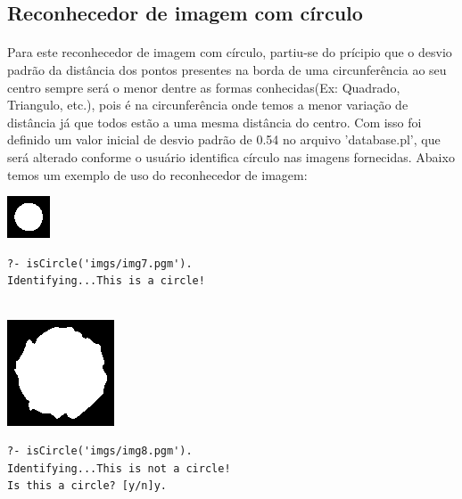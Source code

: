 \documentclass{article}
\begin{document}
\subsection*{Reconhecedor de imagem com círculo}
\paragraph{}
	Para este reconhecedor de imagem com círculo, partiu-se do prícipio que o desvio padrão da distância dos pontos presentes na borda de uma circunferência ao seu centro sempre será o menor dentre as formas conhecidas(Ex: Quadrado, Triangulo, etc.), pois é na circunferência onde temos a menor variação de distância já que todos estão a uma mesma distância do centro. Com isso foi definido um valor inicial de desvio padrão de 0.54 no arquivo 'database.pl', que será alterado conforme o usuário identifica círculo nas imagens fornecidas. Abaixo temos um exemplo de uso do reconhecedor de imagem:
	\\
\begin{center}
\includegraphics[scale=1.00]{texImgs/img7.eps}
\end{center}

\begin{center}
\begin{minipage}{6cm}
\begin{Verbatim}
?- isCircle('imgs/img7.pgm').
Identifying...This is a circle!


\end{Verbatim}
\end{minipage}
\end{center}

\begin{center}
\includegraphics[scale=1.00]{texImgs/img8.eps}
\end{center}

\begin{center}
\begin{minipage}{6cm}
\begin{Verbatim}
?- isCircle('imgs/img8.pgm').
Identifying...This is not a circle!
Is this a circle? [y/n]y.


\end{Verbatim}
\end{minipage}
\end{center}
\end{document}
